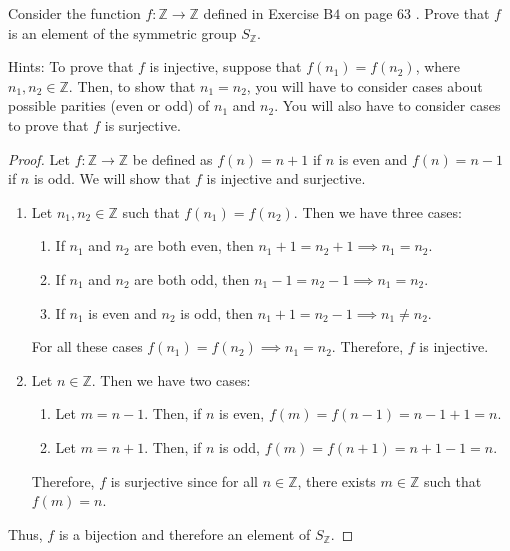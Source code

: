 \documentclass[12pt]{article}
\newenvironment{problem}[2][Problem]{\begin{trivlist}
\item[\hskip \labelsep {\bfseries #1}\hskip \labelsep {\bfseries #2.}]}{\end{trivlist}}
\begin{document}
\begin{problem}{2}
Consider the function $f: \mathbb{Z} \rightarrow \mathbb{Z}$ defined in Exercise $\mathrm{B} 4$ on page 63 . Prove that $f$ is an element of the symmetric group $S_{\mathbb{Z}}$.

Hints: To prove that $f$ is injective, suppose that $f\left(n_{1}\right)=f\left(n_{2}\right)$, where $n_{1}, n_{2} \in \mathbb{Z}$. Then, to show that $n_{1}=n_{2}$, you will have to consider cases about possible parities (even or odd) of $n_{1}$ and $n_{2}$. You will also have to consider cases to prove that $f$ is surjective.
\begin{proof}
	Let $f: \mathbb{Z} \rightarrow \mathbb{Z}$ be defined as $f(n) = n+1$ if $n$ is even and $f(n) = n - 1$ if $n$ is odd. We will show that $f$ is injective and surjective.
	\begin{enumerate}
		\item Let $n_1, n_2 \in \mathbb{Z}$ such that $f(n_1) = f(n_2)$. Then we have three cases:	
		\begin{enumerate}
			\item If $n_1$ and $n_2$ are both even, then $n_1 + 1 = n_2 + 1 \implies n_1 = n_2$.
			\item If $n_1$ and $n_2$ are both odd, then $n_1 - 1 = n_2 - 1 \implies n_1 = n_2$.
			\item If $n_1$ is even and $n_2$ is odd, then $n_1 + 1 = n_2 - 1 \implies n_1 \neq n_2$.
		\end{enumerate}
		For all these cases $f(n_1) = f(n_2) \implies n_1 = n_2$. Therefore, $f$ is injective.
		\item Let $n \in \mathbb{Z}$. Then we have two cases:
		\begin{enumerate}
			\item Let $m = n-1$. Then, if $n$ is even, $f(m) = f(n-1) = n-1+1 = n$.
			\item Let $m = n+1$. Then, if $n$ is odd, $f(m) = f(n+1) = n+1-1 = n$.
		\end{enumerate}
		Therefore, $f$ is surjective since for all $n \in \mathbb{Z}$, there exists $m \in \mathbb{Z}$ such that $f(m) = n$.
	\end{enumerate}
	Thus, $f$ is a bijection and therefore an element of $S_{\mathbb{Z}}$.

\end{proof}
\end{problem}
\end{document}
